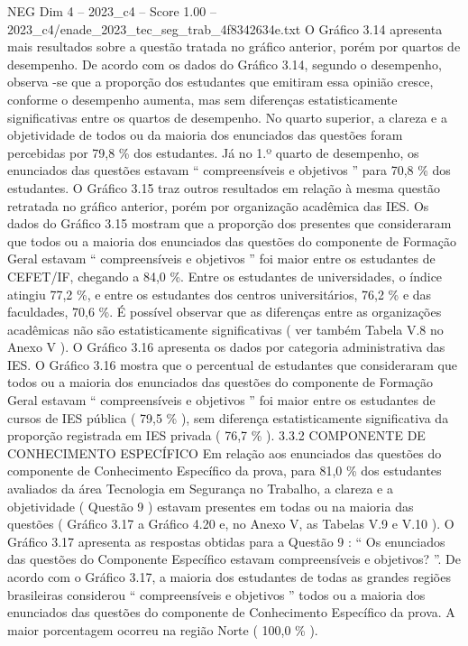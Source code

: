 \begin{textsample}{NEG Dim 4 – 2023\_c4 – Score 1.00 – 2023\_c4/enade\_2023\_tec\_seg\_trab\_4f8342634e.txt}
O Gráfico 3.14 apresenta mais resultados sobre a questão tratada no gráfico anterior, porém por quartos de desempenho.
De acordo com os dados do Gráfico 3.14, segundo o desempenho, observa -se que a proporção dos estudantes que emitiram essa opinião cresce, conforme o desempenho aumenta, mas sem diferenças estatisticamente significativas entre os quartos de desempenho.
No quarto superior, a clareza e a objetividade de todos ou da maioria dos enunciados das questões foram percebidas por 79,8 \% dos estudantes.
Já no 1.º quarto de desempenho, os enunciados das questões estavam “ compreensíveis e objetivos ” para 70,8 \% dos estudantes.
O Gráfico 3.15 traz outros resultados em relação à mesma questão retratada no gráfico anterior, porém por organização acadêmica das IES.
Os dados do Gráfico 3.15 mostram que a proporção dos presentes que consideraram que todos ou a maioria dos enunciados das questões do componente de Formação Geral estavam “ compreensíveis e objetivos ” foi maior entre os estudantes de CEFET/IF, chegando a 84,0 \%.
Entre os estudantes de universidades, o índice atingiu 77,2 \%, e entre os estudantes dos centros universitários, 76,2 \% e das faculdades, 70,6 \%.
É possível observar que as diferenças entre as organizações acadêmicas não são estatisticamente significativas ( ver também Tabela V.8 no Anexo V ).
O Gráfico 3.16 apresenta os dados por categoria administrativa das IES.
O Gráfico 3.16 mostra que o percentual de estudantes que consideraram que todos ou a maioria dos enunciados das questões do componente de Formação Geral estavam “ compreensíveis e objetivos ” foi maior entre os estudantes de cursos de IES pública ( 79,5 \% ), sem diferença estatisticamente significativa da proporção registrada em IES privada ( 76,7 \% ). 3.3.2 COMPONENTE DE CONHECIMENTO ESPECÍFICO Em relação aos enunciados das questões do componente de Conhecimento Específico da prova, para 81,0 \% dos estudantes avaliados da área Tecnologia em Segurança no Trabalho, a clareza e a objetividade ( Questão 9 ) estavam presentes em todas ou na maioria das questões ( Gráfico 3.17 a Gráfico 4.20 e, no Anexo V, as Tabelas V.9 e V.10 ).
O Gráfico 3.17 apresenta as respostas obtidas para a Questão 9 : “ Os enunciados das questões do Componente Específico estavam compreensíveis e objetivos? ”.
De acordo com o Gráfico 3.17, a maioria dos estudantes de todas as grandes regiões brasileiras considerou “ compreensíveis e objetivos ” todos ou a maioria dos enunciados das questões do componente de Conhecimento Específico da prova.
A maior porcentagem ocorreu na região Norte ( 100,0 \% ).

\end{textsample}
